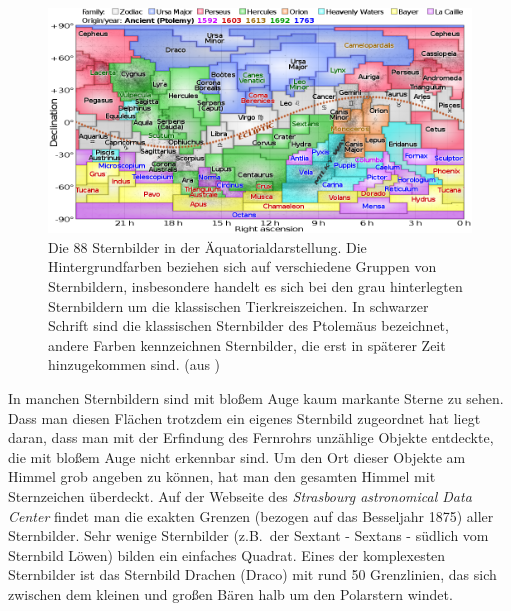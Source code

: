 \begin{figure}[htb]
\includegraphics[scale=0.42]{./Bilder/Constellations.png}  %
\caption{\label{fig_Sternbilder}%
Die 88 Sternbilder in der \"Aquatorialdarstellung. Die Hintergrundfarben beziehen sich auf verschiedene Gruppen
von Sternbildern, insbesondere handelt es sich bei den grau hinterlegten Sternbildern um die klassischen
Tierkreiszeichen. In schwarzer Schrift sind die klassischen Sternbilder des Ptolem\"aus bezeichnet, andere
Farben kennzeichnen Sternbilder, die erst in sp\"aterer Zeit hinzugekommen sind. (aus \cite{Sternbilder})}
\end{figure}

In manchen Sternbildern sind mit blo\ss em Auge kaum markante Sterne zu sehen. 
Dass man diesen Fl\"achen trotzdem 
ein eigenes Sternbild zugeordnet hat liegt daran, dass man mit der Erfindung des Fernrohrs unz\"ahlige Objekte
entdeckte, die mit blo\ss em Auge nicht erkennbar sind. Um den Ort dieser Objekte am Himmel grob angeben
zu k\"onnen, hat man den gesamten Himmel mit Sternzeichen \"uberdeckt. Auf der Webseite des 
\textit{Strasbourg astronomical Data Center} \cite{IAU_Daten}
findet man die exakten Grenzen (bezogen auf das Besseljahr 1875)
aller Sternbilder. Sehr wenige Sternbilder (z.B.\ der Sextant - Sextans - 
s\"udlich vom Sternbild L\"owen) bilden
ein einfaches Quadrat. Eines der komplexesten Sternbilder ist das Sternbild 
Drachen (Draco) mit rund
50 Grenzlinien, das sich zwischen dem kleinen und gro\ss en B\"aren halb um den Polarstern windet.   

